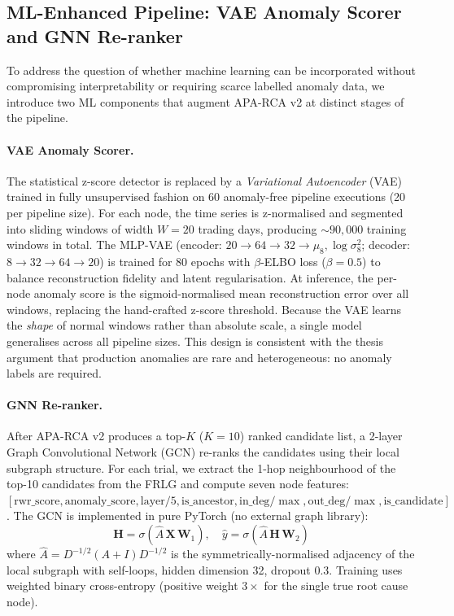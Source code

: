 \documentclass{article}
\newcommand{\aparca}{\textsc{APA-RCA}}
\begin{document}
\subsection{ML-Enhanced Pipeline: VAE Anomaly Scorer and GNN Re-ranker}
\label{sec:ml_enhancement}

To address the question of whether machine learning can be incorporated
without compromising interpretability or requiring scarce labelled anomaly data,
we introduce two ML components that augment \aparca{} v2 at distinct stages of the pipeline.

\paragraph{VAE Anomaly Scorer.}
The statistical z-score detector is replaced by a \emph{Variational Autoencoder}
(VAE) trained in fully unsupervised fashion on 60 anomaly-free pipeline executions
(20 per pipeline size).
For each node, the time series is z-normalised and segmented into sliding windows
of width $W{=}20$ trading days, producing ${\sim}90{,}000$ training windows in total.
The MLP-VAE (encoder: $20 \to 64 \to 32 \to \mu_{8}, \log\sigma^2_{8}$;
decoder: $8 \to 32 \to 64 \to 20$) is trained for 80 epochs with $\beta$-ELBO loss
($\beta{=}0.5$) to balance reconstruction fidelity and latent regularisation.
At inference, the per-node anomaly score is the sigmoid-normalised mean
reconstruction error over all windows, replacing the hand-crafted z-score threshold.
Because the VAE learns the \emph{shape} of normal windows rather than absolute
scale, a single model generalises across all pipeline sizes.
This design is consistent with the thesis argument that production anomalies are
rare and heterogeneous: no anomaly labels are required.

\paragraph{GNN Re-ranker.}
After \aparca{} v2 produces a top-$K$ ($K{=}10$) ranked candidate list,
a 2-layer Graph Convolutional Network (GCN) re-ranks the candidates using
their local subgraph structure.
For each trial, we extract the 1-hop neighbourhood of the top-10 candidates
from the FRLG and compute seven node features:
$[\text{rwr\_score}, \text{anomaly\_score}, \text{layer}/5,
 \text{is\_ancestor}, \text{in\_deg}/\max, \text{out\_deg}/\max, \text{is\_candidate}]$.
The GCN is implemented in pure PyTorch (no external graph library):
\[
  \mathbf{H} = \sigma\!\left(\hat{A}\,\mathbf{X}\,\mathbf{W}_1\right), \quad
  \hat{y}    = \sigma\!\left(\hat{A}\,\mathbf{H}\,\mathbf{W}_2\right)
\]
where $\hat{A} = D^{-1/2}(A+I)D^{-1/2}$ is the symmetrically-normalised
adjacency of the local subgraph with self-loops, hidden dimension 32, dropout 0.3.
Training uses weighted binary cross-entropy
(positive weight $3\times$ for the single true root cause node).
\end{document}
